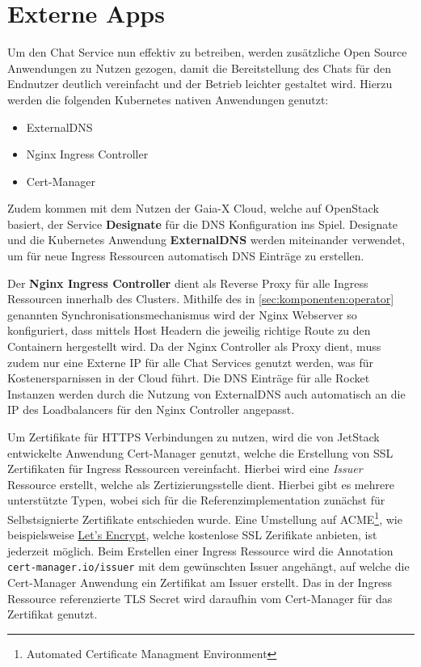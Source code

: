 \section{Externe Apps}
\label{sec:komponenten:externe-apps}

Um den Chat Service nun effektiv zu betreiben, werden zusätzliche Open Source Anwendungen zu Nutzen gezogen,
damit die Bereitstellung des Chats für den Endnutzer deutlich vereinfacht und der Betrieb leichter gestaltet wird.
Hierzu werden die folgenden Kubernetes nativen Anwendungen genutzt:
\begin{itemize}
  \item ExternalDNS
  \item Nginx Ingress Controller
  \item Cert-Manager
\end{itemize}

Zudem kommen mit dem Nutzen der Gaia-X Cloud, welche auf OpenStack basiert, der Service \textbf{Designate}
für die DNS Konfiguration ins Spiel. Designate und die Kubernetes Anwendung \textbf{ExternalDNS} werden miteinander
verwendet, um für neue Ingress Ressourcen automatisch DNS Einträge zu erstellen. 

Der \textbf{Nginx Ingress Controller} dient als Reverse Proxy für alle Ingress Ressourcen innerhalb des Clusters.
Mithilfe des in \ref{sec:komponenten:operator} genannten Synchronisationsmechanismus wird der Nginx Webserver so 
konfiguriert, dass mittels Host Headern die jeweilig richtige Route zu den Containern hergestellt wird. 
Da der Nginx Controller als Proxy dient, muss zudem nur eine Externe IP für alle Chat Services genutzt werden, was
für Kostenersparnissen in der Cloud führt. Die DNS Einträge für alle Rocket Instanzen werden durch die Nutzung 
von ExternalDNS auch automatisch an die IP des Loadbalancers für den Nginx Controller angepasst.

Um Zertifikate für HTTPS Verbindungen zu nutzen, wird die von JetStack entwickelte Anwendung Cert-Manager genutzt,
welche die Erstellung von SSL Zertifikaten für Ingress Ressourcen vereinfacht. Hierbei wird eine \emph{Issuer} Ressource
erstellt, welche als Zertizierungsstelle dient. \cite{CertManager2021} Hierbei gibt es mehrere unterstützte Typen, wobei sich
für die Referenzimplementation zunächst für Selbstsignierte Zertifikate entschieden wurde. 
Eine Umstellung auf ACME\footnote{Automated Certificate Managment Environment},
wie beispielsweise \href{https://letsencrypt.org/de/}{Let's Encrypt}, welche kostenlose SSL Zerifikate anbieten,
ist jederzeit möglich. 
Beim Erstellen einer Ingress Ressource wird die Annotation \texttt{cert-manager.io/issuer} mit dem gewünschten Issuer angehängt,
auf welche die Cert-Manager Anwendung ein Zertifikat am Issuer erstellt. 
Das in der Ingress Ressource referenzierte TLS Secret wird daraufhin vom Cert-Manager für das Zertifikat genutzt.

